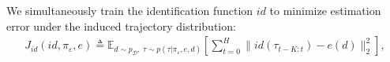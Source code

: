 \documentclass{article}
\newcommand{\E}{\mathbb{E}}
\newcommand{\TODO}[1]{\textcolor{red}{\textbf{TODO: #1}}}
\newcommand{\cN}{\mathcal{N}}
\newcommand{\sysid}{dynamics}
\newcommand{\embedfn}{e}
\newcommand{\idfn}{id}
\newcommand{\idset}{\mathcal{D}}
\newcommand{\idvar}{d}
\newcommand{\idpdf}{p_{\idset}}
\newcommand{\latvar}{\varepsilon}
\newtheorem{assumption}[theorem]{Assumption}
\begin{document}
We simultaneously train the identification function $\idfn$ to minimize estimation error
under the induced trajectory distribution:
\begin{equation}\begin{split}
J_{\idfn}(\idfn, \pi_\latvar, \embedfn) \triangleq
\E_{\idvar \sim \idpdf,\ \tau \sim p(\tau|\pi_\latvar, \embedfn, \idvar)}
\left[
\sum_{t = 0}^{H} \| \idfn(\tau_{t-K:t}) - \embedfn(\idvar) \|_2^2
\right],
\label{objective-observability}
\end{split}\end{equation}
\end{document}
